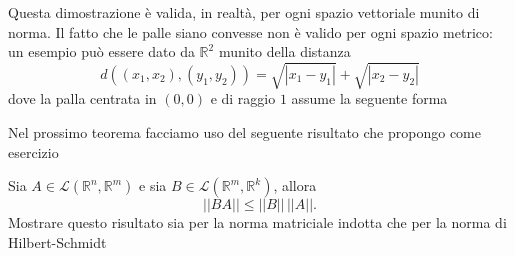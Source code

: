 \begin{remark}
    Questa dimostrazione è valida, in realtà, per ogni spazio vettoriale munito di norma. Il fatto che le palle siano convesse non è valido per ogni spazio metrico: un esempio può essere dato da $\mathbb{R}^2$ munito della distanza
    $$
    d((x_1, x_2), (y_1, y_2)) = \sqrt{|x_1 - y_1|} + \sqrt{|x_2 - y_2|}
    $$
    dove la palla centrata in $(0, 0)$ e di raggio $1$ assume la seguente forma
    
    \begin{figure}[H]
        \centering
    \end{figure}
\end{remark}
Nel prossimo teorema facciamo uso del seguente risultato che propongo come esercizio
\begin{exercise}
    Sia $A \in \mathcal{L}(\mathbb{R}^n, \mathbb{R}^m)$ e sia $B \in \mathcal{L}(\mathbb{R}^m, \mathbb{R}^k)$, allora
    $$
        || BA || \leq || B || \, || A ||.
    $$
    Mostrare questo risultato sia per la norma matriciale indotta che per la norma di Hilbert-Schmidt
\end{exercise}
